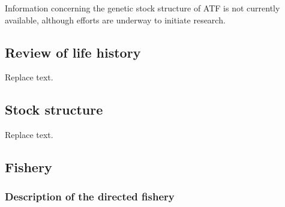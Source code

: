 \documentclass[11pt,
  english,
  a4paper,
]{article}
\begin{document}
\leavevmode\tagmcend\tagstructend\par


Information concerning the genetic stock structure of ATF is not currently available, although efforts are underway to initiate research.

\leavevmode\tagmcend\tagstructend\par


\hypertarget{review-of-life-history}{%
\subsection{Review of life history}\label{review-of-life-history}}

\leavevmode\tagmcend\tagstructend


Replace text.

\leavevmode\tagmcend\tagstructend\par


\hypertarget{stock-structure}{%
\subsection{Stock structure}\label{stock-structure}}

\leavevmode\tagmcend\tagstructend


Replace text.

\leavevmode\tagmcend\tagstructend\par


\hypertarget{fishery}{%
\subsection{Fishery}\label{fishery}}

\leavevmode\tagmcend\tagstructend


\hypertarget{description-of-the-directed-fishery}{%
\subsubsection{Description of the directed fishery}\label{description-of-the-directed-fishery}}
\end{document}
